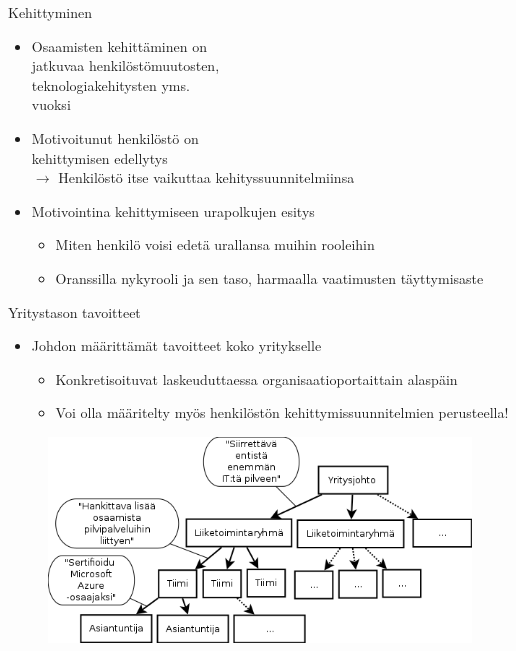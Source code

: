 \documentclass[first=purple,second=dblue,logo=redquo]{aaltoslides}
\begin{document}
\begin{frame}{Kehittyminen}
\begin{itemize}
\item Osaamisten kehittäminen on \\ jatkuvaa henkilöstömuutosten, \\ teknologiakehitysten yms. \\ vuoksi
\item Motivoitunut henkilöstö on \\ kehittymisen edellytys \\ $\rightarrow$ Henkilöstö itse vaikuttaa kehityssuunnitelmiinsa
\item Motivointina kehittymiseen urapolkujen esitys
\begin{itemize}
\item Miten henkilö voisi edetä urallansa muihin rooleihin
\item Oranssilla nykyrooli ja sen taso, harmaalla vaatimusten täyttymisaste
\end{itemize}
\end{itemize}
\end{frame}
\begin{frame}{Yritystason tavoitteet}
\begin{itemize}
\item Johdon määrittämät tavoitteet koko yritykselle
\begin{itemize}
\item Konkretisoituvat laskeuduttaessa organisaatioportaittain alaspäin
\item Voi olla määritelty myös henkilöstön kehittymissuunnitelmien perusteella!
\end{itemize}
\end{itemize}
\begin{figure}
\includegraphics[width=.8\textwidth]{tavoitesample.png}
\end{figure}
\end{frame}
\end{document}
